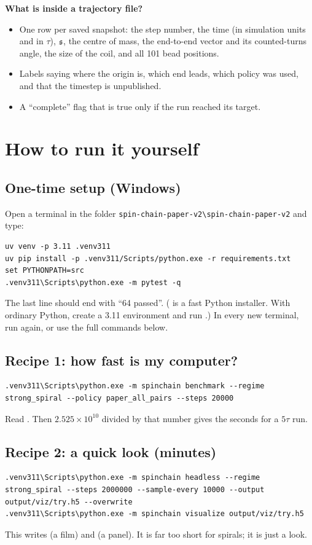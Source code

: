 \textbf{What is inside a trajectory file?}
\begin{itemize}
\item One row per saved snapshot: the step number, the time (in simulation units and in $\tau$), $\mathfrak{s}$, the centre of mass, the end-to-end vector and its counted-turns angle, the size of the coil, and all 101 bead positions.
\item Labels saying where the origin is, which end leads, which policy was used, and that the timestep is unpublished.
\item A ``complete'' flag that is true only if the run reached its target.
\end{itemize}

\section{How to run it yourself}
\subsection{One-time setup (Windows)}
Open a terminal in the folder \texttt{spin-chain-paper-v2\textbackslash spin-chain-paper-v2} and type:
\begin{lstlisting}[style=sh]
uv venv -p 3.11 .venv311
uv pip install -p .venv311/Scripts/python.exe -r requirements.txt
set PYTHONPATH=src
.venv311\Scripts\python.exe -m pytest -q
\end{lstlisting}
The last line should end with ``64 passed''. ( is a fast Python installer. With ordinary Python, create a 3.11 environment and run .)
In every new terminal, run  again, or use the full commands below.

\subsection{Recipe 1: how fast is my computer?}
\begin{lstlisting}[style=sh]
.venv311\Scripts\python.exe -m spinchain benchmark --regime strong_spiral --policy paper_all_pairs --steps 20000
\end{lstlisting}
Read . Then $2.525\times10^{10}$ divided by that number gives the seconds for a $5\tau$ run.

\subsection{Recipe 2: a quick look (minutes)}
\begin{lstlisting}[style=sh]
.venv311\Scripts\python.exe -m spinchain headless --regime strong_spiral --steps 2000000 --sample-every 10000 --output output/viz/try.h5 --overwrite
.venv311\Scripts\python.exe -m spinchain visualize output/viz/try.h5
\end{lstlisting}
This writes  (a film) and  (a panel). It is far too short for spirals; it is just a look.

